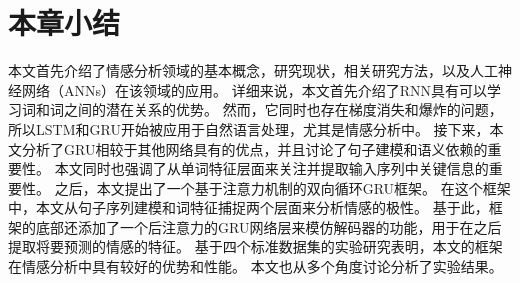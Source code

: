 \section{本章小结}
本文首先介绍了情感分析领域的基本概念，研究现状，相关研究方法，以及人工神经网络（ANNs）在该领域的应用。
详细来说，本文首先介绍了RNN具有可以学习词和词之间的潜在关系的优势。
然而，它同时也存在梯度消失和爆炸的问题，所以LSTM和GRU开始被应用于自然语言处理，尤其是情感分析中。
接下来，本文分析了GRU相较于其他网络具有的优点，并且讨论了句子建模和语义依赖的重要性。
本文同时也强调了从单词特征层面来关注并提取输入序列中关键信息的重要性。
之后，本文提出了一个基于注意力机制的双向循环GRU框架。
在这个框架中，本文从句子序列建模和词特征捕捉两个层面来分析情感的极性。
基于此，框架的底部还添加了一个后注意力的GRU网络层来模仿解码器的功能，用于在之后提取将要预测的情感的特征。
基于四个标准数据集的实验研究表明，本文的框架在情感分析中具有较好的优势和性能。
本文也从多个角度讨论分析了实验结果。
